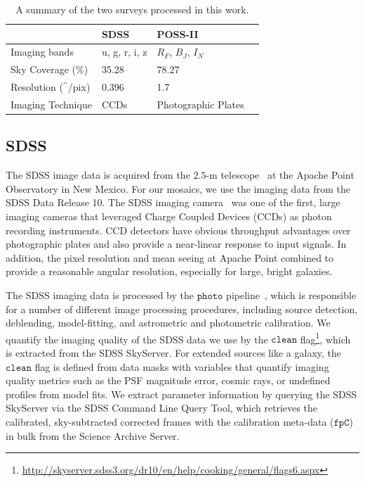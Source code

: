 \documentclass[authoryear, 12pt, 5p, times]{elsarticle}
\begin{document}
\begin{table}
\footnotesize
    \begin{tabular}{llll}
    \hline
    ~                           & SDSS    & POSS-II             \\ \hline
    Imaging bands               & u, g, r, i, z  & $R_F$, $B_J$, $I_N$             \\
    Sky Coverage (\%)                & 35.28 & 78.27             \\
    Resolution ($^{\prime\prime}$/pix) & 0.396  & 1.7                 \\
    Imaging Technique           & CCDs    & Photographic Plates\\ \hline
    \end{tabular}
    \label{table:comptbl}
    \caption{{\footnotesize A summary of the two surveys processed in this work.}}
\end{table}

\subsection{SDSS}
The SDSS image data is acquired from the $2.5$-m telescope~\citep{sdss-tel} at the Apache Point Observatory in New Mexico. For our mosaics, we use the imaging data from the SDSS Data Release 10. The SDSS imaging camera~\citep{sdss-camera} was one of the first, large imaging cameras that leveraged Charge Coupled Devices (CCDs) as photon recording instruments. CCD detectors have obvious throughput advantages over photographic plates and also provide a near-linear response to input signals. In addition, the pixel resolution and mean seeing at Apache Point combined to provide a reasonable angular resolution, especially for large, bright galaxies. 

The SDSS imaging data is processed by the $\texttt{photo}$ pipeline~\citep{sdss-photo}, which is responsible for a number of different image processing procedures, including source detection, deblending, model-fitting, and astrometric and photometric calibration. We quantify the imaging quality of the SDSS data we use by the $\texttt{clean}$ flag\footnote{\url{http://skyserver.sdss3.org/dr10/en/help/cooking/general/flags6.aspx}}, which is extracted from the SDSS SkyServer. For extended sources like a galaxy, the $\texttt{clean}$ flag is defined from data masks with variables that quantify imaging quality metrics such as the PSF magnitude error, cosmic rays, or undefined profiles from model fits. We extract parameter information by querying the SDSS SkyServer via the SDSS Command Line Query Tool, which retrieves the calibrated, sky-subtracted corrected frames with the calibration meta-data ($\texttt{fpC}$) in bulk from the Science Archive Server.
\end{document}
